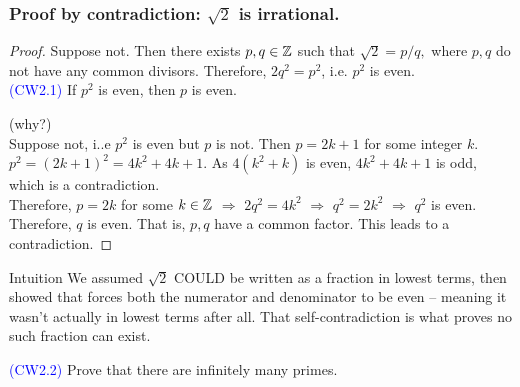  \begin{frame}[fragile]
\frametitle{Proof by contradiction: $\sqrt{2}$ is irrational.}

\begin{proof}
Suppose not. Then there exists $p,q \in {{\mathbb{Z}}}$ such that $\sqrt{2}=p/q,$ where $p,q$ do not have any common divisors. Therefore, $2q^2 = p^2$, i.e. $p^2$ is even. \\

\textcolor{blue}{(CW2.1)} If $p^2$ is even, then $p$ is even. 


(why?) \\
Suppose not, i..e $p^2$ is even but $p$ is not. Then $p = 2k +1$ for some integer $k$. $p^2 = (2k+1)^2=
4k^2+4k +1$. As $4(k^2+k)$ is even,  $4k^2+4k +1$ is odd, which is a contradiction.\\



Therefore, $p=2k$ for some $k \in {{\mathbb{Z}}}$ $\Rightarrow$ $2q^2 = 4k^2$ $\Rightarrow$ $q^2 = 2k^2$ $\Rightarrow$ $q^2$ is even. Therefore, $q$ is even. That is, $p,q$ have a common factor. This leads to a contradiction.
\end{proof}

\begin{block}{Intuition}
We assumed $\sqrt{2}$ COULD be written as a fraction in lowest terms, then showed that forces both the numerator and denominator to be even -- meaning it wasn't actually in lowest terms after all. That self-contradiction is what proves no such fraction can exist.
\end{block}

\textcolor{blue}{(CW2.2)} Prove that there are infinitely many primes.
\end{frame}

